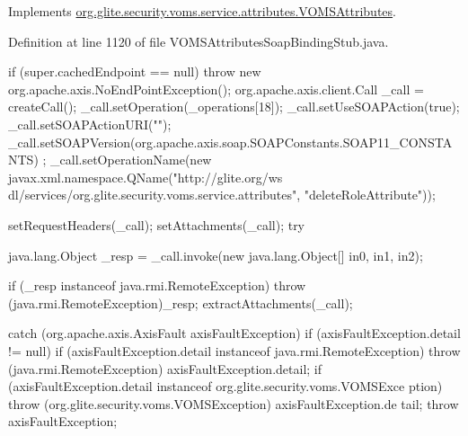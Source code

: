 Implements \hyperlink{interfaceorg_1_1glite_1_1security_1_1voms_1_1service_1_1attributes_1_1VOMSAttributes_aa728f2ded931b28c408c9e6e19752317}{org.glite.security.voms.service.attributes.VOMSAttributes}.



Definition at line 1120 of file VOMSAttributesSoapBindingStub.java.


\begin{DoxyCode}
                                                                                 
                                                                                       
                                                          {
        if (super.cachedEndpoint == null) {
            throw new org.apache.axis.NoEndPointException();
        }
        org.apache.axis.client.Call _call = createCall();
        _call.setOperation(_operations[18]);
        _call.setUseSOAPAction(true);
        _call.setSOAPActionURI("");
        _call.setSOAPVersion(org.apache.axis.soap.SOAPConstants.SOAP11_CONSTANTS)
      ;
        _call.setOperationName(new javax.xml.namespace.QName("http://glite.org/ws
      dl/services/org.glite.security.voms.service.attributes", "deleteRoleAttribute"));
      

        setRequestHeaders(_call);
        setAttachments(_call);
 try {        java.lang.Object _resp = _call.invoke(new java.lang.Object[] {in0, 
      in1, in2});

        if (_resp instanceof java.rmi.RemoteException) {
            throw (java.rmi.RemoteException)_resp;
        }
        extractAttachments(_call);
  } catch (org.apache.axis.AxisFault axisFaultException) {
    if (axisFaultException.detail != null) {
        if (axisFaultException.detail instanceof java.rmi.RemoteException) {
              throw (java.rmi.RemoteException) axisFaultException.detail;
         }
        if (axisFaultException.detail instanceof org.glite.security.voms.VOMSExce
      ption) {
              throw (org.glite.security.voms.VOMSException) axisFaultException.de
      tail;
         }
   }
  throw axisFaultException;
}
    }
\end{DoxyCode}
